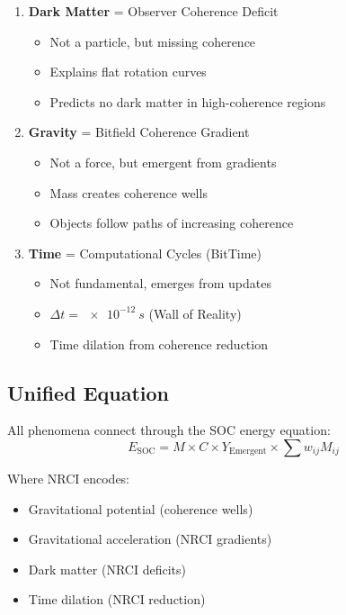 \documentclass[12pt,a4paper]{article}
\begin{document}
\begin{enumerate}
\item \textbf{Dark Matter} = Observer Coherence Deficit
\begin{itemize}
\item Not a particle, but missing coherence
\item Explains flat rotation curves
\item Predicts no dark matter in high-coherence regions
\end{itemize}

\item \textbf{Gravity} = Bitfield Coherence Gradient
\begin{itemize}
\item Not a force, but emergent from gradients
\item Mass creates coherence wells
\item Objects follow paths of increasing coherence
\end{itemize}

\item \textbf{Time} = Computational Cycles (BitTime)
\begin{itemize}
\item Not fundamental, emerges from updates
\item $\Delta t = \SI{e-12}{s}$ (Wall of Reality)
\item Time dilation from coherence reduction
\end{itemize}
\end{enumerate}

\subsection{Unified Equation}

All phenomena connect through the SOC energy equation:
\begin{equation}
E_{\text{SOC}} = M \times C \times Y_{\text{Emergent}} \times \sum w_{ij} M_{ij}
\end{equation}

Where NRCI encodes:
\begin{itemize}
\item Gravitational potential (coherence wells)
\item Gravitational acceleration (NRCI gradients)
\item Dark matter (NRCI deficits)
\item Time dilation (NRCI reduction)
\end{itemize}
\end{document}
